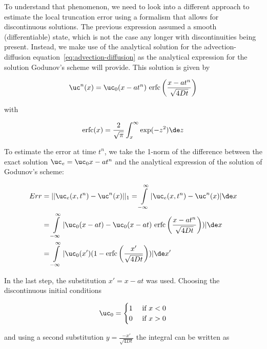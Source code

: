 To understand that phenomenon, we need to look into a different approach to estimate the local
truncation error using a formalism that allows for discontinuous solutions. The previous expression
assumed a smooth (differentiable) state, which is not the case any longer with discontinuities
being present. Instead, we make use of the analytical solution for the advection-diffusion
equation~\ref{eq:advection-diffusion} as the analytical expression for the solution Godunov's
scheme will provide. This solution is given by

\begin{align}
    \uc^n(x) = \uc_0(x - a t^n) \ \mathrm{erfc}\left(\frac{x - at^n}{\sqrt{4 D t}} \right)
\end{align}

with

\begin{align}
    \mathrm{erfc}(x) = \frac{2}{\sqrt{\pi}} \int_x^\infty \exp (-z^2) \de z
\end{align}


To estimate the error at time $t^n$, we take the 1-norm of the difference between the exact
solution $\uc_e = \uc_0{x - at^n}$ and the analytical expression of the solution of Godunov's
scheme:

\begin{align}
    Err &= || \uc_e(x, t^n) - \uc^n(x) ||_1
        = \int\limits_{-\infty}^{\infty} | \uc_e(x, t^n) - \uc^n(x) | \de x \\
        &= \int\limits_{-\infty}^{\infty}
            | \uc_0(x - at) - \uc_0(x - at) \ \mathrm{erfc}\left(\frac{x - at^n}{\sqrt{4 D t}}
\right)) | \de x \\
        &= \int\limits_{-\infty}^{\infty}
            | \uc_0(x') (1 - \mathrm{erfc}\left(\frac{x'}{\sqrt{4 D t}} \right)) | \de x'
\end{align}

In the last step, the substitution $x' = x - at$ was used. Choosing the discontinuous initial
conditions

\begin{align}
    \uc_0 = \begin{cases}
            1 & \text{ if } x < 0\\
            0 & \text{ if } x > 0\\
            \end{cases}
\end{align}

and using a second substitution $y = \frac{-x'}{\sqrt{4 D t}}$ the integral can be written as

